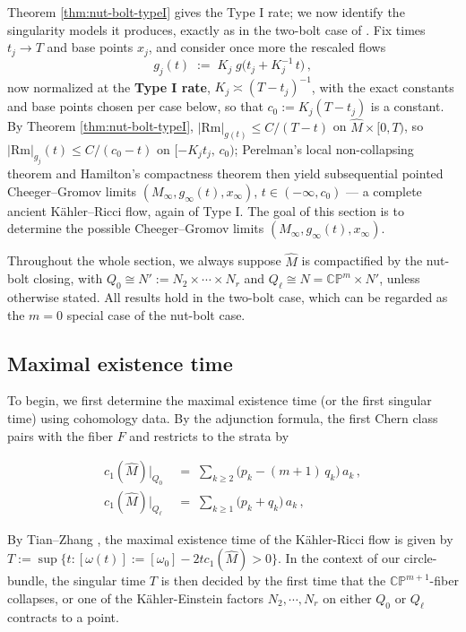 \documentclass[11pt]{amsart}
\theoremstyle{plain}
\numberwithin{equation}{section}
\theoremstyle{definition}
\theoremstyle{remark}
\begin{document}
Theorem \ref{thm:nut-bolt-typeI} gives the Type I rate; we now identify the singularity models it produces, exactly as in the two-bolt case of \cite{FT}. Fix times $t_j \to T$ and base points $x_j$, and consider once more the rescaled flows
\[
g_j (t) \;:=\; K_j\; g \big( t_j + K_j^{-1}\, t \big) \,,
\]
now normalized at the \textbf{Type I rate}, $K_j \asymp ( T - t_j )^{-1}$, with the exact constants and base points chosen per case below, so that $c_0 := K_j ( T - t_j )$ is a constant. By Theorem \ref{thm:nut-bolt-typeI}, $| \mathrm{Rm} |_{g (t)} \leq C / ( T - t )$ on $\widehat{M} \times [0, T)$, so $| \mathrm{Rm} |_{g_j} (t) \leq C / ( c_0 - t )$ on $[ - K_j t_j, \, c_0 )$; Perelman's local non-collapsing theorem \cite{Perelman} and Hamilton's compactness theorem \cite{HamCompact} then yield subsequential pointed Cheeger--Gromov limits $( M_\infty, g_\infty (t), x_\infty )$, $t \in ( - \infty, c_0 )$ --- a complete ancient Kähler--Ricci flow, again of Type I. The goal of this section is to determine the possible Cheeger--Gromov limits $( M_\infty, g_\infty (t), x_\infty )$.

Throughout the whole section, we always suppose $\widehat{M}$ is compactified by the nut-bolt closing, with $Q_0 \cong N' := N_2 \times \cdots \times N_r$ and $Q_\ell \cong N = \mathbb{CP}^m \times N'$, unless otherwise stated. All results hold in the two-bolt case, which can be regarded as the $m = 0$ special case of the nut-bolt case.

\subsection{Maximal existence time}
To begin, we first determine the maximal existence time (or the first singular time) using cohomology data. By the adjunction formula, the first Chern class pairs with the fiber $F$ and restricts to the strata by

\begin{align*}
c_1(\widehat{M}) \big|_{Q_0} & \;=\; \sum_{k \geq 2} \big( p_k - (m+1)\, q_k \big)\, a_k\,, \\
c_1(\widehat{M}) \big|_{Q_\ell} & \;=\; \sum_{k \geq 1} \big( p_k + q_k \big)\, a_k\,,
\end{align*}

By Tian--Zhang \cite{TZ}, the maximal existence time of the K\"ahler-Ricci flow is given by $T := \sup\{t : [\omega(t)] := [\omega_0] - 2tc_1(\widehat{M}) > 0\}$. In the context of our circle-bundle, the singular time $T$ is then decided by the first time that the $\mathbb{CP}^{m+1}$-fiber collapses, or one of the K\"ahler-Einstein factors $N_2, \cdots, N_r$ on either $Q_0$ or $Q_\ell$ contracts to a point.
\end{document}
